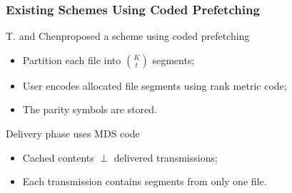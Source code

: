 \documentclass{beamer}
\begin{document}
\begin{frame}
\frametitle{Existing Schemes Using Coded Prefetching}
T. and Chen\footnotemark[1] proposed a scheme using coded prefetching
\begin{itemize}
\item Partition each file into $\binom{K}{t}$ segments;
\pause
\item User encodes allocated file segments using rank metric code;
\item The parity symbols are stored.
\end{itemize}
\pause
Delivery phase uses MDS code
\begin{itemize}
	\item Cached contents $\perp$ delivered transmissions; 
	\item Each transmission contains segments from only one file.
\end{itemize}


\end{frame}
\end{document}
